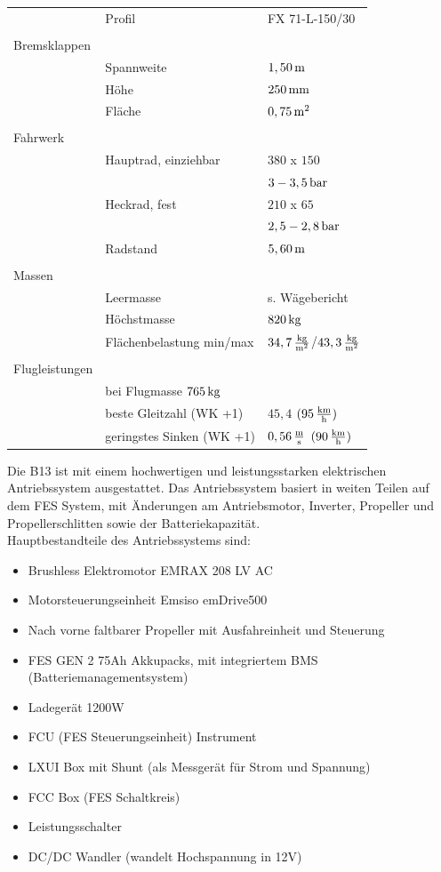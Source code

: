 \begin{longtable}{l l l}
 & Profil & FX 71-L-150/30\\
 & & \\
 Bremsklappen & & \\
 & Spannweite & $\unit[1,50]{m}$\\
 & Höhe & $\unit[250]{mm}$ \\
 & Fläche & $\unit[0,75]{m^2}$\\
 & & \\
 Fahrwerk & & \\
 & Hauptrad, einziehbar & $380$ x $150$\\ 
 & & $\unit[3-3,5]{bar}$\\
 & Heckrad, fest & $210$ x $65$ \\ 
 & & $\unit[2,5-2,8]{bar}$\\
 & Radstand & $\unit[5,60]{m}$\\
 & & \\
 Massen & & \\
 & Leermasse & s. Wägebericht\\
 & Höchstmasse & $\unit[820]{kg}$\\
 & Flächenbelastung min/max & $\unit[34,7]{\frac{kg}{m^2}}$/$\unit[43,3]{\frac{kg}{m^2}}$\\
 & & \\
 Flugleistungen & & \\
 & bei Flugmasse $\unit[765]{kg}$ & \\
 & beste Gleitzahl (WK +1) & $45,4$ $(\unit[95]{\frac{km}{h}})$ \\
 & geringstes Sinken (WK +1) & $\unit[0,56]{\frac{m}{s}}$ $ (\unit[90]{\frac{km}{h}})$

\end{longtable}
\newpage
Die B13 ist mit einem hochwertigen und leistungsstarken elektrischen Antriebssystem ausgestattet. Das Antriebssystem basiert in weiten Teilen auf dem FES System, mit Änderungen am Antriebsmotor, Inverter, Propeller und Propellerschlitten sowie der Batteriekapazität.\\

Hauptbestandteile des Antriebssystems sind:
\begin{itemize}
\item Brushless Elektromotor EMRAX 208 LV AC
\item Motorsteuerungseinheit Emsiso emDrive500
\item Nach vorne faltbarer Propeller mit Ausfahreinheit und Steuerung
\item FES GEN 2 75Ah Akkupacks, mit integriertem BMS (Batteriemanagementsystem)
\item Ladegerät 1200W
\item FCU (FES Steuerungseinheit) Instrument
\item LXUI Box mit Shunt (als Messgerät für Strom und Spannung)
\item FCC Box (FES Schaltkreis)
\item Leistungsschalter
\item DC/DC Wandler (wandelt Hochspannung in 12V)
\end{itemize}



